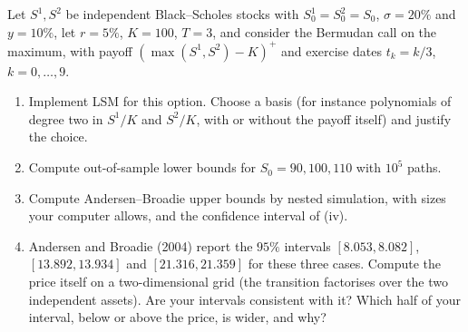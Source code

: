 \begin{exercise}\label{ex:am-max-call}
\hard Let $S^1,S^2$ be independent Black--Scholes stocks with $S^1_0=S^2_0=S_0$,
$\sigma=20\%$ and $y=10\%$, let $r=5\%$, $K=100$, $T=3$, and consider the Bermudan call on
the maximum, with payoff $(\max(S^1,S^2)-K)^+$ and exercise dates $t_k=k/3$, $k=0,\dots,9$.
\begin{enumerate}[label=(\alph*)]
  \item Implement LSM for this option. Choose a basis (for instance polynomials of degree two
    in $S^1/K$ and $S^2/K$, with or without the payoff itself) and justify the choice.
  \item Compute out-of-sample lower bounds for $S_0=90,100,110$ with $10^5$ paths.
  \item Compute Andersen--Broadie upper bounds by nested simulation, with sizes your computer
    allows, and the confidence interval of (iv).
  \item Andersen and Broadie (2004) report the $95\%$ intervals $[8.053,8.082]$,
    $[13.892,13.934]$ and $[21.316,21.359]$ for these three cases. Compute the price itself
    on a two-dimensional grid (the transition factorises over the two independent assets).
    Are your intervals consistent with it? Which half of your interval, below or above the
    price, is wider, and why?
\end{enumerate}
\end{exercise}
